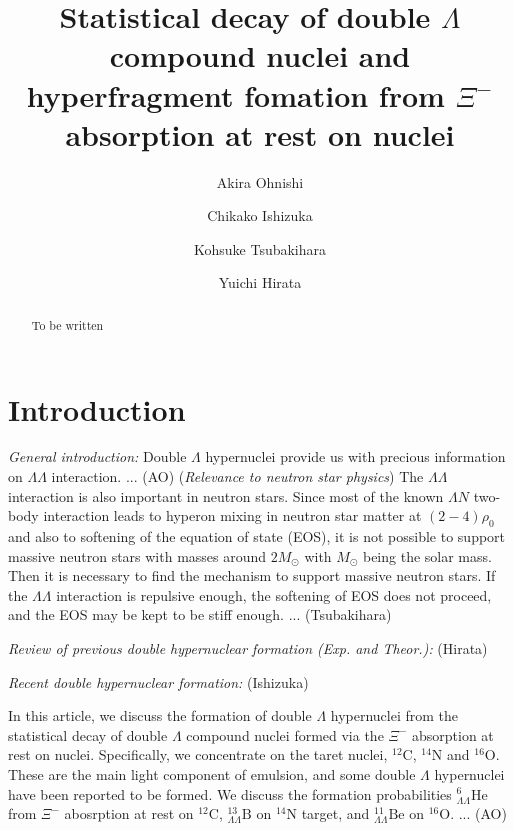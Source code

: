 \documentclass{ptephy_v1}
\newcommand{\LL}{\Lambda\Lambda}
\newcommand{\nuc}[2]{{}^{#1}\mathrm{#2}}
\newcommand{\nucLL}[2]{{}^{#1}_{\LL}\mathrm{#2}}
\begin{document}

\title{
Statistical decay of double $\Lambda$ compound nuclei
and hyperfragment fomation
from $\Xi^-$ absorption at rest on nuclei
}

\author[1]{Akira Ohnishi}

\author[2]{Chikako Ishizuka}

\author[2]{Kohsuke Tsubakihara}

\author[3]{Yuichi Hirata}

\begin{abstract}
To be written
\end{abstract}

\maketitle

\section{Introduction}
{\em General introduction:}
Double $\Lambda$ hypernuclei provide us with precious information 
on $\Lambda\Lambda$ interaction. ... (AO)
({\em Relevance to neutron star physics})
The $\LL$ interaction is also important in neutron stars.
Since most of the known $\Lambda N$ two-body interaction
leads to hyperon mixing in neutron star matter at $(2-4)\rho_0$
and also to softening of the equation of state (EOS),
it is not possible to support massive neutron stars with masses
around $2 M_\odot$ with $M_\odot$ being the solar mass.
Then it is necessary to find the mechanism to support massive neutron stars.
If the $\LL$ interaction is repulsive enough,
the softening of EOS does not proceed, and the EOS may be kept to be 
stiff enough. ... (Tsubakihara)


{\em Review of previous double hypernuclear formation (Exp. and Theor.):}
(Hirata)

{\em Recent double hypernuclear formation:}
(Ishizuka)

In this article, we discuss the formation of double $\Lambda$ hypernuclei
from the statistical decay of double $\Lambda$ compound nuclei
formed via the $\Xi^-$ absorption at rest on nuclei.
Specifically, we concentrate on the taret nuclei,
$\nuc{12}{C}$, $\nuc{14}{N}$ and $\nuc{16}{O}$.
These are the main light component of emulsion,
and some double $\Lambda$ hypernuclei have been reported to be formed.
We discuss the formation probabilities 
$\nucLL{6}{He}$ from $\Xi^-$ abosrption at rest on $\nuc{12}{C}$,
$\nucLL{13}{B}$ on $\nuc{14}{N}$ target,
and 
$\nucLL{11}{Be}$ on $\nuc{16}{O}$.
... (AO)
\end{document}
